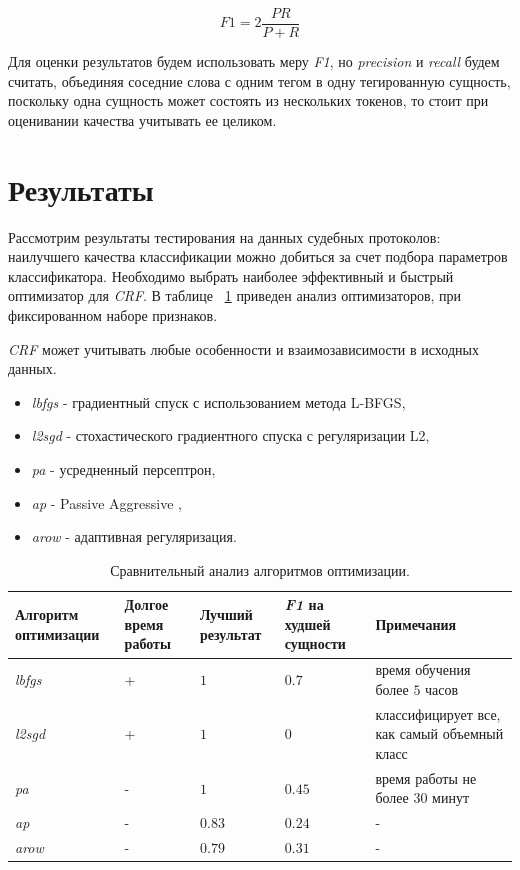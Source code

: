 \documentclass{csmathnotes}
\begin{document}
\begin{equation}\label{eq:f1}
F1 = 2\frac{P R}{P + R} 
\end{equation}

Для оценки результатов будем использовать меру \emph{F1}, но \emph{precision} и \emph{recall} будем считать, объединяя соседние слова с одним тегом в одну тегированную сущность, поскольку одна сущность может состоять из нескольких токенов, то стоит при оценивании качества учитывать ее целиком. 

\section*{Результаты}
Рассмотрим результаты тестирования на данных судебных протоколов: наилучшего качества классификации можно добиться за счет подбора параметров классификатора. Необходимо выбрать наиболее эффективный и быстрый оптимизатор для \emph{CRF}. В таблице ~\ref{tabl:table1} приведен анализ оптимизаторов, при фиксированном наборе признаков.


\emph{CRF} может учитывать любые особенности и взаимозависимости в исходных данных.
\begin{itemize}
	\item \emph{lbfgs} - градиентный спуск с использованием метода 
	L-BFGS,
	\item \emph{l2sgd} - стохастического  градиентного спуска  с регуляризации L2,
	\item \emph{pa} - усредненный персептрон,
	\item \emph{ap} - Passive Aggressive ,
	\item \emph{arow} - адаптивная регуляризация.
\end{itemize}

\begin{table}[!h]
    \begin{center}
        \begin{tabular}{|p{2cm}|p{1.3cm}|p{1.5cm}|p{1.5cm}|p{2.5cm}|}
            \hline
            Алгоритм оптимизации &  Долгое время работы & Лучший результат & \emph{F1} на худшей сущности & Примечания \\
            \hline
            \emph{lbfgs} & + & $1$ & $0.7$ & время обучения более $5$ часов  \\
            \hline
            \emph{l2sgd} & + & $1$  & $0$ & классифицирует все, как самый объемный класс \\
            \hline
            \emph{pa} & - & $1$  & $0.45$ & время работы не более $30$ минут \\
            \hline
            \emph{ap} & - & $0.83$ & $0.24$  & - \\
            \hline
            \emph{arow} & - & $0.79$ & $0.31$  & - \\
            \hline
        \end{tabular}
    \end{center}
    \caption{\label{tabl:table1}Сравнительный анализ алгоритмов оптимизации.}
\end{table}
\end{document}
